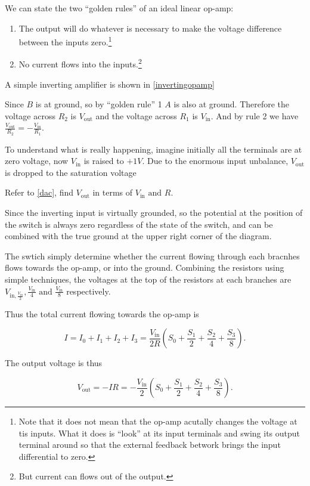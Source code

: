 \documentclass[english,a4paper,12pt]{report}
\begin{document}
We can state the two ``golden rules'' of an ideal linear op-amp:

\begin{enumerate}
    \item The output will do whatever is necessary to make the voltage difference between the inputs zero.\footnote{Note that it does not mean that the op-amp acutally changes the voltage at tis inputs. What it does is ``look'' at its input terminals and swing its output terminal around so that the external feedback betwork brings the input differential to zero.}
    \item No current flows into the inputs.\footnote{But current can flows out of the output.} 
\end{enumerate}

A simple inverting amplifier is shown in \cref{invertingopamp} 


Since \(B\) is at ground, so by ``golden rule'' 1 \(A\) is also at ground. Therefore the voltage across \(R_2 \) is \(V_{\text{out}} \) and the voltage across \(R_1 \) is \(V_{\text{in}} \). And by rule 2 we have \(\displaystyle \frac{V_{\text{out}} }{R_2 } = - \frac{V_{\text{in}} }{R_1 }  \). 

To understand what is really happening, imagine initially all the terminals are at zero voltage, now \(V_{\text{in}} \) is raised to \(+1V\). Due to the enormous input unbalance, \(V_{\text{out}} \) is dropped to the saturation voltage  

{Refer to \cref{dac}, find \(V_{\text{out} } \) in terms of \(V_{\text{in} }\text { and } R \).  }
{Since the inverting input is virtually grounded, so the potential at the position of the switch is always zero regardless of the state of the switch, and can be combined with the true ground at the upper right corner of the diagram.

The swtich simply determine whether the current flowing through each bracnhes flows towards the op-amp, or into the ground. Combining the resistors using simple techniques, the voltages at the top of the resistors at each branches are \(V_{\text{in}, \frac{V_{\text{in} } }{2} }, \frac{V_{\text{in} } }{4}  \text { and } \frac{V_{\text{in} } }{8}  \) respectively. 

Thus the total current flowing towards the op-amp is

\begin{equation}
    I = I_0 + I_1 + I_2 + I_3 = \frac{V_{\text{in} } }{2R}\left( S_0 + \frac{S_1}{2} + \frac{S_2 }{4} + \frac{S_3}{8} \right). 
\end{equation}

The output voltage is thus 

\begin{equation}
    V_{\text{out} } = - IR =  - \frac{V_{\text{in} } }{2}\left( S_0 + \frac{S_1}{2} + \frac{S_2 }{4} + \frac{S_3}{8} \right).
\end{equation}


} 

\end{document}

